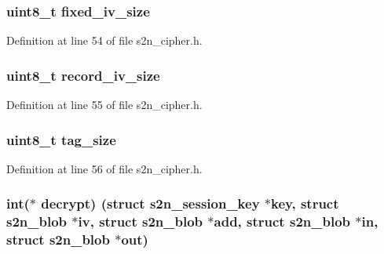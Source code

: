 \subsubsection[{\texorpdfstring{fixed\+\_\+iv\+\_\+size}{fixed_iv_size}}]{\setlength{\rightskip}{0pt plus 5cm}uint8\+\_\+t fixed\+\_\+iv\+\_\+size}\hypertarget{structs2n__aead__cipher_af2f96dd7607527cb38344275a4282922}{}\label{structs2n__aead__cipher_af2f96dd7607527cb38344275a4282922}


Definition at line 54 of file s2n\+\_\+cipher.\+h.

\subsubsection[{\texorpdfstring{record\+\_\+iv\+\_\+size}{record_iv_size}}]{\setlength{\rightskip}{0pt plus 5cm}uint8\+\_\+t record\+\_\+iv\+\_\+size}\hypertarget{structs2n__aead__cipher_af6c57bc6bf62e1b811c6771a76e38448}{}\label{structs2n__aead__cipher_af6c57bc6bf62e1b811c6771a76e38448}


Definition at line 55 of file s2n\+\_\+cipher.\+h.

\subsubsection[{\texorpdfstring{tag\+\_\+size}{tag_size}}]{\setlength{\rightskip}{0pt plus 5cm}uint8\+\_\+t tag\+\_\+size}\hypertarget{structs2n__aead__cipher_a0bcbed39d70cb77892a96690e07f5389}{}\label{structs2n__aead__cipher_a0bcbed39d70cb77892a96690e07f5389}


Definition at line 56 of file s2n\+\_\+cipher.\+h.

\subsubsection[{\texorpdfstring{decrypt}{decrypt}}]{\setlength{\rightskip}{0pt plus 5cm}int($\ast$ decrypt) (struct {\bf s2n\+\_\+session\+\_\+key} $\ast$key, struct {\bf s2n\+\_\+blob} $\ast$iv, struct {\bf s2n\+\_\+blob} $\ast$add, struct {\bf s2n\+\_\+blob} $\ast$in, struct {\bf s2n\+\_\+blob} $\ast$out)}\hypertarget{structs2n__aead__cipher_ab0de9f364ac505a11483b249e38b492c}{}\label{structs2n__aead__cipher_ab0de9f364ac505a11483b249e38b492c}


